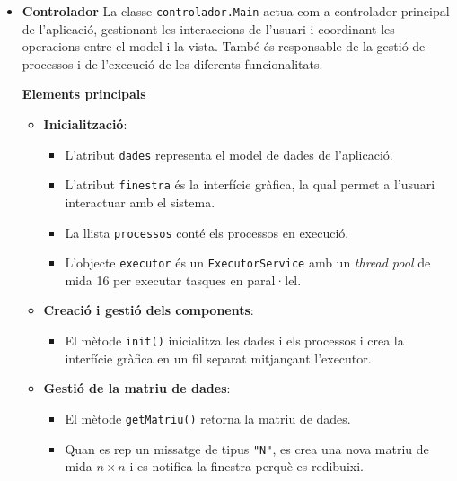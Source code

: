 \documentclass{ieeetj}
\begin{document}
\begin{itemize}
\item\textbf{Controlador}
La classe \texttt{controlador.Main} actua com a controlador principal de l'aplicació, gestionant les interaccions de l'usuari i coordinant les operacions entre el model i la vista. També és responsable de la gestió de processos i de l'execució de les diferents funcionalitats.

\textbf{Elements principals}
\begin{itemize}
    \item \textbf{Inicialització}: 
    \begin{itemize}
        \item L'atribut \texttt{dades} representa el model de dades de l'aplicació.
        \item L'atribut \texttt{finestra} és la interfície gràfica, la qual permet a l'usuari interactuar amb el sistema.
        \item La llista \texttt{processos} conté els processos en execució.
        \item L'objecte \texttt{executor} és un \texttt{ExecutorService} amb un \textit{thread pool} de mida 16 per executar tasques en paral·lel.
    \end{itemize}
    
    \item \textbf{Creació i gestió dels components}:
    \begin{itemize}
        \item El mètode \texttt{init()} inicialitza les dades i els processos i crea la interfície gràfica en un fil separat mitjançant l'executor.
    \end{itemize}
    
    \item \textbf{Gestió de la matriu de dades}:
    \begin{itemize}
        \item El mètode \texttt{getMatriu()} retorna la matriu de dades.
        \item Quan es rep un missatge de tipus \texttt{"N"}, es crea una nova matriu de mida \(n \times n\) i es notifica la finestra perquè es redibuixi.
    \end{itemize}
    

\end{itemize}
\end{itemize}
\end{document}
